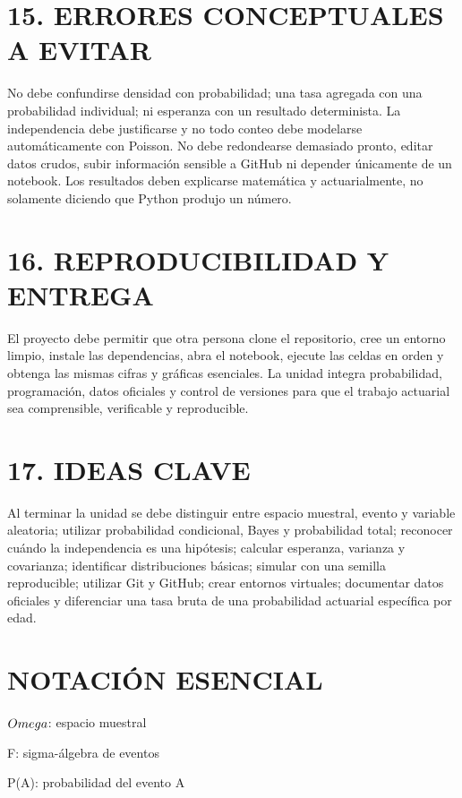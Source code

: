 \documentclass[11pt]{article}
\begin{document}
\section*{15. ERRORES CONCEPTUALES A EVITAR}

No debe confundirse densidad con probabilidad; una tasa agregada con una probabilidad individual; ni esperanza con un resultado determinista. La independencia debe justificarse y no todo conteo debe modelarse automáticamente con Poisson. No debe redondearse demasiado pronto, editar datos crudos, subir información sensible a GitHub ni depender únicamente de un notebook. Los resultados deben explicarse matemática y actuarialmente, no solamente diciendo que Python produjo un número.

\section*{16. REPRODUCIBILIDAD Y ENTREGA}

El proyecto debe permitir que otra persona clone el repositorio, cree un entorno limpio, instale las dependencias, abra el notebook, ejecute las celdas en orden y obtenga las mismas cifras y gráficas esenciales. La unidad integra probabilidad, programación, datos oficiales y control de versiones para que el trabajo actuarial sea comprensible, verificable y reproducible.

\section*{17. IDEAS CLAVE}

Al terminar la unidad se debe distinguir entre espacio muestral, evento y variable aleatoria; utilizar probabilidad condicional, Bayes y probabilidad total; reconocer cuándo la independencia es una hipótesis; calcular esperanza, varianza y covarianza; identificar distribuciones básicas; simular con una semilla reproducible; utilizar Git y GitHub; crear entornos virtuales; documentar datos oficiales y diferenciar una tasa bruta de una probabilidad actuarial específica por edad.

\section*{NOTACIÓN ESENCIAL}

$\\Omega$: espacio muestral

F: sigma-álgebra de eventos

P(A): probabilidad del evento A
\end{document}

